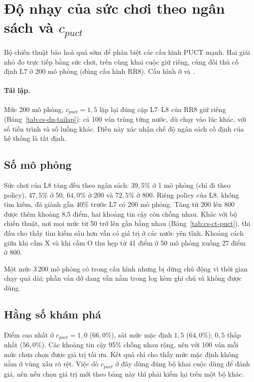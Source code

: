 \section{Độ nhạy của sức chơi theo ngân sách và \texorpdfstring{$c_{puct}$}{c\_puct}}
\label{sec:cs-do-nhay}
Bộ chiến thuật bão hoà quá sớm để phân biệt các cấu hình PUCT mạnh. Hai giải nhỏ đo trực tiếp bằng sức chơi, trên cùng
khai cuộc giữ riêng, cùng đối thủ cố định L7 ở 200 mô phỏng (đúng cấu hình RR8). Cấu hình ở
 và .

\paragraph{Tái lập.} Mức 200 mô phỏng, $c_{puct}=1{,}5$ lặp lại đúng cặp L7--L8 của RR8 giữ riêng
(Bảng~\ref{tab:cs-dn-tailap}): cả 100 ván trùng từng nước, dù chạy vào lúc khác, với số tiến trình và số luồng khác.
Điều này xác nhận chế độ ngân sách cố định của hệ thống là tất định.


\subsection{Số mô phỏng}

Sức chơi của L8 tăng đều theo ngân sách: $39{,}5\%$ ở 1 mô phỏng (chỉ đi theo policy), $47{,}5\%$ ở 50, $64{,}0\%$ ở 200 và
$72{,}5\%$ ở 800. Riêng policy của L8, không tìm kiếm, đã giành gần $40\%$ trước L7 có 200 mô phỏng. Tăng từ 200 lên 800
được thêm khoảng 8,5 điểm, hai khoảng tin cậy còn chồng nhau. Khác với bộ chiến thuật, nơi mọi mức từ 50 trở lên gần
bằng nhau (Bảng~\ref{tab:cs-ct-puct}), thi đấu cho thấy tìm kiếm sâu hơn vẫn có giá trị ở các nước yên tĩnh. Khoảng cách
giữa khi cầm X và khi cầm O thu hẹp từ 41 điểm ở 50 mô phỏng xuống 27 điểm ở 800.

Một mức 3\,200 mô phỏng có trong cấu hình nhưng bị dừng chủ động vì thời gian chạy quá dài; phần ván dở dang vẫn nằm
trong log kèm ghi chú và không được dùng.

\subsection{Hằng số khám phá}

Điểm cao nhất ở $c_{puct}=1{,}0$ ($66{,}0\%$), sát mức mặc định $1{,}5$ ($64{,}0\%$); $0{,}5$ thấp nhất ($56{,}0\%$). Các khoảng
tin cậy 95\% chồng nhau rộng, nên với 100 ván mỗi mức chưa chọn được giá trị tối ưu. Kết quả chỉ cho thấy mức mặc định
không nằm ở vùng xấu rõ rệt. Việc dò $c_{puct}$ ở đây dùng đúng bộ khai cuộc dùng để đánh giá, nên nếu chọn giá trị mới
theo bảng này thì phải kiểm lại trên một bộ khác.

